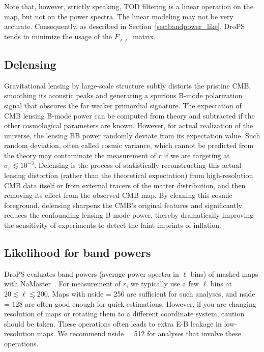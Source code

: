 \documentclass[12pt, a4paper]{ctexart} %
\begin{document}
Note that, however, strictly speaking, TOD filtering is a linear operation on the map, but not on the power spectra. The linear modeling may not be very accurate. Consequently, as described in Section~\ref{sec:bandpower_like}, DroPS tends to minimize the usage of the $F_{\ell\ell^\prime}$ matrix.

\subsection{Delensing}


Gravitational lensing by large-scale structure subtly distorts the pristine CMB, smoothing its acoustic peaks and generating a spurious B-mode polarization signal that obscures the far weaker primordial signature. The expectation of CMB lensing B-mode power can be computed from theory and subtracted if the other cosmological parameters are known. However, for actual realization of the universe, the lensing BB power randomly deviate from its expectation value. Such random deviation, often called cosmic variance, which cannot be predicted from the theory may contaminate the measurement of $r$ if we are targeting at $\sigma_r \lesssim 10^{-3}$. Delensing is the process of statistically reconstructing this actual lensing distortion (rather than the theoretical expectation) from high-resolution CMB data itself or from external tracers of the matter distribution, and then removing its effect from the observed CMB map. By cleaning this cosmic foreground, delensing sharpens the CMB's original features and significantly reduces the confounding lensing B-mode power, thereby dramatically improving the sensitivity of experiments to detect the faint imprints of inflation.



\subsection{Likelihood for band powers~\label{sec:bandpower_like}}

DroPS evaluates band powers (average power spectra in $\ell$ bins) of masked maps with NaMaster~\cite{NaMaster}. For measurement of $r$, we typically use a few $\ell$ bins at $20\lesssim \ell \lesssim 200$. Maps with nside = 256 are sufficient for such analyses, and nside = 128 are often good enough for quick estimations. However, if you are changing resolution of maps or rotating them to a different coordinate system, caution should be taken. These operations often leads to extra E-B leakage in low-resolution maps. We recommend nside = 512 for analyses that involve these operations.
\end{document}
